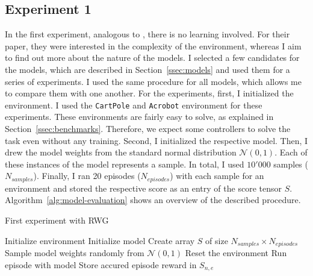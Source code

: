 \subsection{Experiment 1}
In the first experiment, analogous to \citet{oller_analyzing_2020}, there is no learning involved. For their paper, they were interested in the complexity of the environment, whereas I aim to find out more about the nature of the models. I selected a few candidates for the models, which are described in Section~\ref{ssec:models} and used them for a series of experiments. I used the same procedure for all models, which allows me to compare them with one another. For the experiments, first, I initialized the environment. I used the \verb|CartPole| and \verb|Acrobot| environment for these experiments. These environments are fairly easy to solve, as explained in Section~\ref{ssec:benchmarks}. Therefore, we expect some controllers to solve the task even without any training. Second, I initialized the respective model. Then, I drew the model weights from the standard normal distribution $\mathcal{N}(0,1)$. Each of these instances of the model represents a sample. In total, I used $10'000$ samples ($N_{samples}$). Finally, I ran 20 episodes ($N_{episodes}$) with each sample for an environment and stored the respective score as an entry of the score tensor $S$. Algorithm~\ref{alg:model-evaluation} shows an overview of the described procedure.
\begin{algorithm}
\caption{First experiment with RWG}
\begin{algorithmic}[1]
\State Initialize environment
\State Initialize model
\State Create array $S$ of size $N_{samples} \times N_{episodes}$
    \State Sample model weights randomly from $\mathcal{N}(0,1)$
      \State Reset the environment
      \State Run episode with model
      \State Store accured episode reward in $S_{n,e}$
    \EndFor
\EndFor
\end{algorithmic}
\label{alg:model-evaluation}
\end{algorithm}

